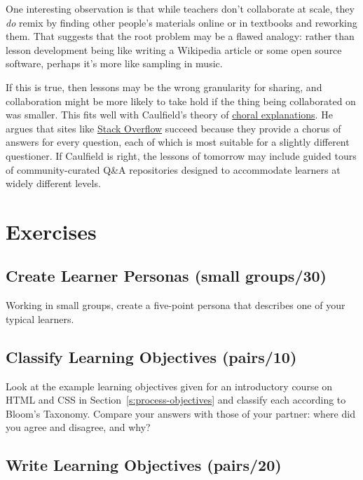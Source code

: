 One interesting observation is that while teachers don't collaborate
at scale, they \emph{do} remix by finding other people's materials online
or in textbooks and reworking them. That suggests that the root
problem may be a flawed analogy: rather than lesson development being
like writing a Wikipedia article or some open source software, perhaps
it's more like sampling in music.

If this is true, then lessons may be the wrong granularity for
sharing, and collaboration might be more likely to take hold if the
thing being collaborated on was smaller. This fits well with
Caulfield's theory of \href{https://hapgood.us/2016/05/13/choral-explanations/}{choral explanations}. He
argues that sites like \href{https://stackoverflow.com/}{Stack Overflow} succeed
because they provide a chorus of answers for every question, each of
which is most suitable for a slightly different questioner. If
Caulfield is right, the lessons of tomorrow may include guided tours
of community-curated Q\&A repositories designed to accommodate learners
at widely different levels.

\section{Exercises}\label{s:process-exercises}

\subsection{Create Learner Personas (small groups/30)}\label{create-learner-personas-small-groups30}

Working in small groups, create a five-point persona that describes one
of your typical learners.

\subsection{Classify Learning Objectives (pairs/10)}\label{classify-learning-objectives-pairs10}

Look at the example learning objectives given for an introductory course
on HTML and CSS in Section~\ref{s:process-objectives} and classify each
according to Bloom's Taxonomy. Compare your answers with those of your
partner: where did you agree and disagree, and why?

\subsection{Write Learning Objectives (pairs/20)}\label{write-learning-objectives-pairs20}

